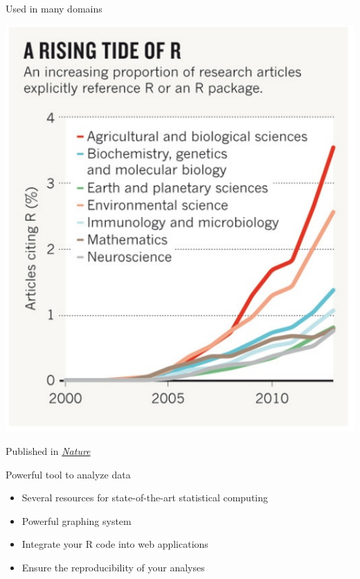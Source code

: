 \documentclass[11pt]{beamer}\usepackage[]{graphicx}\usepackage[]{color}
\begin{document}
\begin{frame}{Used in many domains}

\begin{center}
\includegraphics[scale=0.7]{citeR.png}
\end{center}

\vspace{0.05in}

Published in \href{http://www.nature.com/news/programming-tools-adventures-with-r-1.16609}{\textit{Nature}}
\end{frame}


\begin{frame}{Powerful tool to analyze data}
\begin{itemize}
  \setlength\itemsep{2em}
\item Several resources for state-of-the-art statistical computing
\item Powerful graphing system
\item Integrate your R code into web applications
\item Ensure the reproducibility of your analyses
\end{itemize}
\end{frame}
\end{document}
